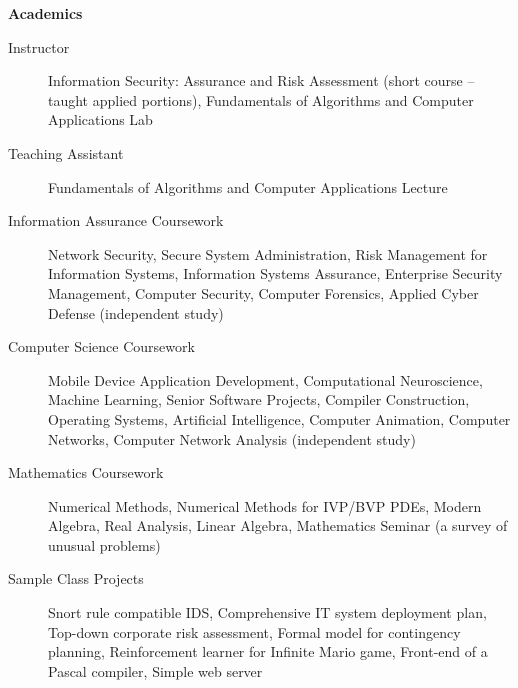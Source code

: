 \documentclass[letterpaper,11pt]{article}
\newcommand{\resheading}[1]{{\large \colorbox{mygrey}{\begin{minipage}
    {\textwidth}{\textbf{#1 \vphantom{p\^{E}}}}\end{minipage}}}}
\begin{document}
\resheading{Academics}
    \begin{description}
        \item[Instructor] Information Security: Assurance and Risk Assessment
        (short course -- taught applied portions), Fundamentals of Algorithms
        and Computer Applications Lab
        \item[Teaching Assistant] Fundamentals of Algorithms and Computer
        Applications Lecture
        \item[Information Assurance Coursework] Network Security, Secure
        System Administration, Risk Management for Information Systems,
        Information Systems Assurance, Enterprise Security Management,
        Computer Security, Computer Forensics, Applied Cyber Defense
        (independent study)
        \item[Computer Science Coursework] Mobile Device Application Development,
        Computational Neuroscience, Machine
        Learning, Senior Software Projects, Compiler Construction, Operating
        Systems, Artificial Intelligence, Computer Animation, Computer Networks,
        Computer Network Analysis (independent study)
        \item[Mathematics Coursework] Numerical Methods, Numerical Methods for
        IVP/BVP PDEs, Modern Algebra, Real Analysis, Linear Algebra, Mathematics
        Seminar (a survey of unusual problems)
        \item[Sample Class Projects] Snort rule compatible IDS,
        Comprehensive IT system deployment plan,
        Top-down corporate risk assessment, Formal model for contingency planning,
        Reinforcement learner for Infinite Mario game, Front-end of a Pascal
        compiler, Simple web server
    \end{description}
\end{document}

